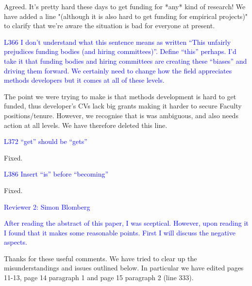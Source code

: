 \documentclass[12pt]{letter}
\begin{document}
\begin{letter}{}
Agreed. It's pretty hard these days to get funding for *any* kind of research! We have added a line "(although it is also hard to get funding for empirical projects)" to clarify that we're aware the situation is bad for everyone at present.

\textcolor{blue}{L366 I don't understand what this sentence means as written “This unfairly prejudices funding bodies (and hiring committees)”. Define “this” perhaps. I'd take it that funding bodies and hiring committees are creating these “biases” and driving them forward. We certainly need to change how the field appreciates methods developers but it comes at all of these levels.}

The point we were trying to make is that methods development is hard to get funded, thus developer's CVs lack big grants making it harder to secure Faculty positions/tenure. However, we recognise that is was ambiguous, and also needs action at all levels. We have therefore deleted this line.

\textcolor{blue}{L372 “get” should be “gets”}

Fixed.

\textcolor{blue}{L386 Insert “is” before “becoming”}

Fixed. 

\textcolor{blue}{Reviewer 2: Simon Blomberg}

\textcolor{blue}{After reading the abstract of this paper, I was sceptical. However, upon reading it I found that it makes some reasonable points. First I will discuss the negative aspects.}

Thanks for these useful comments. We have tried to clear up the misunderstandings and issues outlined below. In particular we have edited pages 11-13, page 14 paragraph 1 and page 15 paragraph 2 (line 333).


\end{letter}
\end{document}
